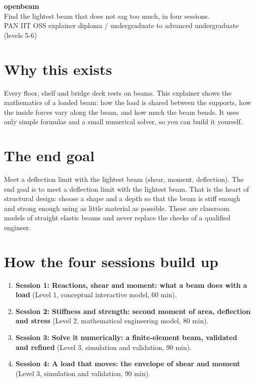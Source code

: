 \documentclass[11pt,a4paper]{article}
\begin{document}
\begin{center}{\LARGE\bfseries openbeam}\\[0.4em]{\large Find the lightest beam that does not sag too much, in four sessions.}\\[0.2em]\small PAN IIT OSS explainer \textbullet{} diploma / undergraduate to advanced undergraduate (levels 5-6)\end{center}

\section*{Why this exists}
Every floor, shelf and bridge deck rests on beams. This explainer shows the mathematics of a loaded beam: how the load is shared between the supports, how the inside forces vary along the beam, and how much the beam bends. It uses only simple formulas and a small numerical solver, so you can build it yourself.

\section*{The end goal}
Meet a deflection limit with the lightest beam (shear, moment, deflection). The end goal is to meet a deflection limit with the lightest beam. That is the heart of structural design: choose a shape and a depth so that the beam is stiff enough and strong enough using as little material as possible. These are classroom models of straight elastic beams and never replace the checks of a qualified engineer.

\section*{How the four sessions build up}
\begin{enumerate}[nosep]
\item \textbf{Session 1: Reactions, shear and moment: what a beam does with a load} (Level 1, conceptual interactive model, 60 min).
\item \textbf{Session 2: Stiffness and strength: second moment of area, deflection and stress} (Level 2, mathematical engineering model, 80 min).
\item \textbf{Session 3: Solve it numerically: a finite-element beam, validated and refined} (Level 3, simulation and validation, 90 min).
\item \textbf{Session 4: A load that moves: the envelope of shear and moment} (Level 3, simulation and validation, 90 min).
\end{enumerate}
\end{document}
